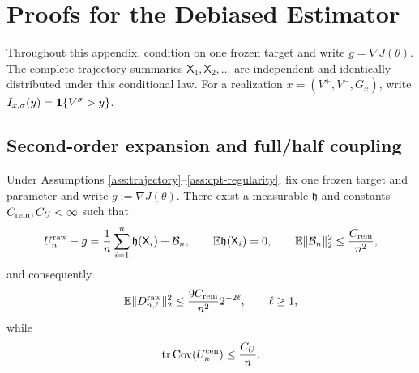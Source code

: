 \section{Proofs for the Debiased Estimator}\label{app:estimator}

Throughout this appendix, condition on one frozen target and write
$g=\nabla J(\theta)$.  The complete trajectory summaries $\mathsf X_1,\mathsf X_2,\ldots$ are independent and identically distributed under this conditional law.
For a realization $x=(V^+,V^-,G_x)$, write $I_{x,\sigma}(y)=\mathbf 1\{V^\sigma>y\}$.

\subsection{Second-order expansion and full/half coupling}

\begin{lemma}\label{lem:level-cancellation}
Under Assumptions \ref{ass:trajectory}--\ref{ass:cpt-regularity}, fix one frozen target and parameter and write $g:=\nabla J(\theta)$.  There exist a measurable $\mathfrak h$ and constants $C_{\rm rem},C_U<\infty$ such that
\begin{equation}\label{eq:loo-expansion}
 U_n^{\rm raw}-g
 =\frac1n\sum_{i=1}^{n}\mathfrak h(\mathsf X_i)+\mathcal B_n,
 \qquad
 \mathbb E\mathfrak h(\mathsf X_i)=0,
 \qquad
 \mathbb E\lVert\mathcal B_n\rVert_2^2\le\frac{C_{\rm rem}}{n^2},
\end{equation}
and consequently
\begin{equation}\label{eq:level-second-moment}
 \mathbb E\lVert D_{n,\ell}^{\rm raw}\rVert_2^2
 \le\frac{9C_{\rm rem}}{n^2}2^{-2\ell},
 \qquad \ell\ge1,
\end{equation}
while
\begin{equation}\label{eq:centered-loo-variance}
 \operatorname{tr}\operatorname{Cov}(U_n^{\rm cen})\le\frac{C_U}{n}.
\end{equation}
\end{lemma}

